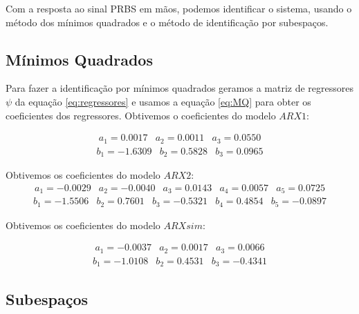 Com a resposta ao sinal PRBS em mãos, podemos identificar o sistema, usando o método dos mínimos quadrados e o método de identificação por subespaços.

\subsection{Mínimos Quadrados}\label{s:4estmq}
Para fazer a identificação por mínimos quadrados geramos a matriz de regressores $\psi$ da equação \eqref{eq:regressores} e usamos a equação \eqref{eq:MQ} para obter os coeficientes dos regressores. Obtivemos o coeficientes do modelo $ARX1$:

\begin{equation}
\begin{matrix}
a_1= 0.0017 &
a_2=0.0011&
a_3=0.0550
\end{matrix}
\end{equation}
\begin{equation}
\begin{matrix}
b_1= -1.6309   &
b_2= 0.5828 &
b_3=   0.0965
\end{matrix}
\end{equation}

Obtivemos os coeficientes do modelo $ARX2$:
\begin{equation}
\begin{matrix}
a_1= -0.0029  &
a_2= -0.0040   &
a_3= 0.0143  &
a_4=  0.0057 &
a_5=  0.0725
\end{matrix}
\end{equation}
\begin{equation}
\begin{matrix}
b_1= -1.5506  &
b_2=  0.7601  &
b_3= -0.5321  &
b_4=  0.4854 &
b_5=  -0.0897
\end{matrix}
\end{equation}

Obtivemos os coeficientes do modelo $ARXsim$:

\begin{equation}
\begin{matrix}
a_1= -0.0037 &
a_2=  0.0017 &
a_3=   0.0066 
\end{matrix}
\end{equation}
\begin{equation}
\begin{matrix}
b_1=-1.0108   &
b_2= 0.4531  &
b_3= -0.4341
\end{matrix}
\end{equation}


\subsection{Subespaços}\label{s:4estsub}

